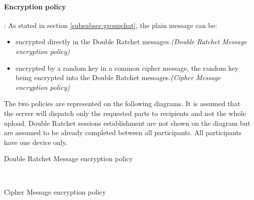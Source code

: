 \documentclass[a4paper,11pt]{article}
\begin{document}
      \paragraph*{Encryption policy}: As stated in section \ref{subsubsec:groupchat}, the plain message can be:
      \label{encryptionPolicyMSC}
      \begin{itemize}
        \item encrypted directly in the Double Ratchet messages.\textit{(Double Ratchet Message encryption policy)}
        \item encrypted by a random key in a common cipher message, the random key being encrypted into the Double Ratchet messages.\textit{(Cipher Message encryption policy)}
      \end{itemize}
      The two policies are represented on the following diagrams. It is assumed that the server will dispatch only the requested parts to recipients and not the whole upload. Double Ratchet sessions establishment are not shown on the diagram but are assumed to be already completed between all participants. All participants have one device only.\\\newline
      \begin{msc}{Double Ratchet Message encryption policy}
        \setlength{\instdist}{2.2cm}
        \setlength{\instwidth}{1.9cm}
        \setlength{\actionwidth}{1.7cm}
        \setlength{\envinstdist}{1.7cm}
        \nextlevel[3]
        \nextlevel[1]
        \nextlevel[2]
      \end{msc}
      \\\newline
      \begin{msc}{Cipher Message encryption policy}
        \setlength{\instdist}{2.2cm}
        \setlength{\instwidth}{1.9cm}
        \setlength{\actionwidth}{1.7cm}
        \setlength{\envinstdist}{1.9cm}
        \nextlevel[3]
        \nextlevel[2]
        \nextlevel[2]
      \end{msc}
\end{document}
